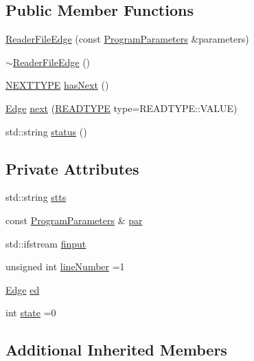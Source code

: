 \subsection*{Public Member Functions}
\begin{DoxyCompactItemize}
\item 
\hyperlink{classReaderFileEdge_a519fd6f5c53a07c2019a36519ca68ea7}{Reader\+File\+Edge} (const \hyperlink{structProgramParameters}{Program\+Parameters} \&parameters)
\item 
\hyperlink{classReaderFileEdge_aa4560a4109cd547de863f2efd2eeb779}{$\sim$\+Reader\+File\+Edge} ()
\item 
\hyperlink{classReaderInterface_ac2420ec8d2f60feadf2533d4fa77ec5e}{N\+E\+X\+T\+T\+Y\+PE} \hyperlink{classReaderFileEdge_a319f75e4d3ff14a4270e9da8ade89a3b}{has\+Next} ()
\item 
\hyperlink{classEdge}{Edge} \hyperlink{classReaderFileEdge_a97f967287fdf7f4804139ba9d123494c}{next} (\hyperlink{classReaderInterface_a1e3610c289ae058a246de41154d8a266}{R\+E\+A\+D\+T\+Y\+PE} type=R\+E\+A\+D\+T\+Y\+P\+E\+::\+V\+A\+L\+UE)
\item 
std\+::string \hyperlink{classReaderFileEdge_a05205d129f4f59c5cbd4e7a2dcb3d0c1}{status} ()
\end{DoxyCompactItemize}
\subsection*{Private Attributes}
\begin{DoxyCompactItemize}
\item 
std\+::string \hyperlink{classReaderFileEdge_ad530588bc2c71763272396a695e93a8e}{stts}
\item 
const \hyperlink{structProgramParameters}{Program\+Parameters} \& \hyperlink{classReaderFileEdge_a9a956337d362be53e70c6fdbe827b818}{par}
\item 
std\+::ifstream \hyperlink{classReaderFileEdge_a8ccb004737f00ed157d72d59bf005136}{finput}
\item 
unsigned int \hyperlink{classReaderFileEdge_a18237693728b8b807c7ed035f80f96ca}{line\+Number} =1
\item 
\hyperlink{classEdge}{Edge} \hyperlink{classReaderFileEdge_a0880f77cf8a5d28e6cea35e30abb3388}{ed}
\item 
int \hyperlink{classReaderFileEdge_ac1fdd420eec23e7a50bb73c456c6695b}{state} =0
\end{DoxyCompactItemize}
\subsection*{Additional Inherited Members}


